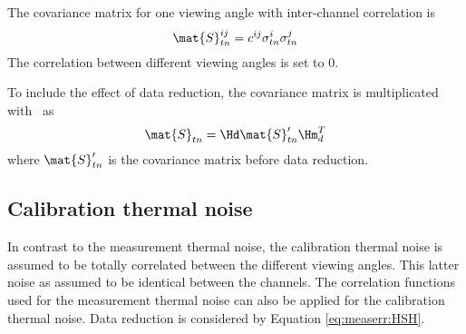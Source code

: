  The covariance matrix for one viewing angle with inter-channel
 correlation is
 \begin{equation}
   \mat{S}_{tn}^{ij} = c^{ij} \sigma_{tn}^i \sigma_{tn}^j
  \label{eq:measerr:Stn}
 \end{equation}
 The correlation between different viewing angles is set to 0.

 To include the effect of data reduction, the covariance matrix is
 multiplicated with \Hd\ as
 \begin{equation}
   \mat{S}_{tn} = \Hd \mat{S}_{tn}' \Hm_d^T 
   \label{eq:measerr:HSH}
 \end{equation}
 where $\mat{S}_{tn}'$ is the covariance matrix before data reduction.


 \subsection{Calibration thermal noise}
 \label{sec:measerr:ctn}
 
 In contrast to the measurement thermal noise, the calibration thermal
 noise is assumed to be totally correlated between the different
 viewing angles. This latter noise as assumed to be identical between the
 channels.
 The correlation functions used for the measurement thermal noise can
 also be applied for the calibration thermal noise.  
 Data reduction is considered by Equation \ref{eq:measerr:HSH}.
 


